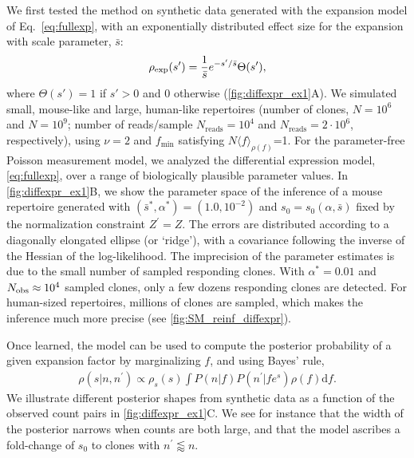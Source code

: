 \documentclass[pre,twocolumn,english,longbibliography]{revtex4}
\newcommand{\beq}{\begin{equation}}
\newcommand{\eeq}{\end{equation}}
\newcommand{\<}{\langle}
\renewcommand{\>}{\rangle}
\begin{document}
We first tested the method on synthetic data generated with the expansion model of Eq.~\ref{eq:fullexp}, with an exponentially distributed effect size for the expansion with scale parameter, $\bar{s}$:
\beq\label{eq:onesidedexp}
\rho_{\rm exp}(s')=\frac{1}{\bar s}e^{-s'/\bar s}\Theta(s'),
\eeq
where $\Theta(s')=1$ if $s'>0$ and $0$ otherwise (\cref{fig:diffexpr_ex1}A).
We simulated small, mouse-like and large, human-like repertoires (number of clones, $N=10^6$ and $N=10^9$; number of reads/sample $N_{\textrm{reads}}=10^4$ and $N_{\textrm{reads}}=2\cdot 10^6$, respectively), using $\nu=2$ and $f_{\textrm{min}}$ satisfying $N\langle f\rangle_{\rho(f)}$=1. For the parameter-free Poisson measurement model, we analyzed the differential expression model, \cref{eq:fullexp}, over a range of biologically plausible parameter values.  
In \cref{fig:diffexpr_ex1}B, we show the parameter space of the inference of a mouse repertoire generated with $(\bar{s}^*,\alpha^* )=(1.0,10^{-2})$ and $s_0=s_0(\alpha,\bar s)$ fixed by the normalization constraint $Z^\prime=Z$. The errors are distributed according to a diagonally elongated ellipse (or `ridge'), with a covariance following the inverse of the Hessian of the log-likelihood.
The imprecision of the parameter estimates is due to the small number of sampled responding clones. With
$\alpha^*=0.01$ and $N_{\rm obs}\approx 10^4$ sampled clones, only a few dozens responding clones are detected. For human-sized repertoires, millions of clones are sampled, which makes the inference much more precise (see \cref{fig:SM_reinf_diffexpr}).

Once learned, the model can be used to compute the posterior probability of a given expansion factor by marginalizing $f$, and using Bayes' rule, 
\begin{align}\label{eq:post}
	\rho(s|n,n^{\prime})\propto \rho_s(s)\int P(n|f)P(n^{\prime}|fe^s)\rho(f)\textrm{d}f.
\end{align}
We illustrate different posterior shapes from synthetic data as a function of the observed count pairs in \cref{fig:diffexpr_ex1}C. We see for instance that the width of the posterior narrows when counts are both large, and that  the model ascribes a fold-change of $s_0$ to clones with $n^{\prime} \lessapprox n$.
\end{document}
